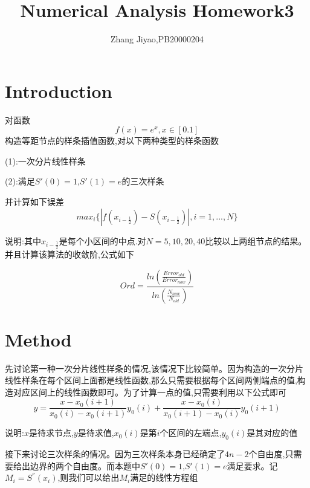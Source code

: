 \documentclass{article}
\title{Numerical Analysis Homework3}
\author{Zhang Jiyao,PB20000204}
\begin{document}
	\maketitle
	
	\section{Introduction}
	
	对函数
	$$ f(x)=e^x,x\in [0.1]$$
	构造等距节点的样条插值函数,对以下两种类型的样条函数
	
	(1):一次分片线性样条
	
	(2):满足$S'(0)=1$,$S'(1)=e$的三次样条
	
	并计算如下误差
	$$max_i\{\left|f(x_{i-\frac{1}{2}})-S(x_{i-\frac{1}{2}})\right|, i=1,...,N \}$$
	
	说明:其中$x_{i-\frac{1}{2}}$是每个小区间的中点.对$N=5,10,20,40$比较以上两组节点的结果。并且计算该算法的收敛阶,公式如下
	
	$$Ord=\frac{ln(\frac{Error_{old}}{Error_{now}})}{ln(\frac{N_{now}}{N_{old}})}$$
	
	
	
	\section{Method}
	
	先讨论第一种一次分片线性样条的情况,该情况下比较简单。因为构造的一次分片线性样条在每个区间上面都是线性函数,那么只需要根据每个区间两侧端点的值,构造对应区间上的线性函数即可。为了计算一点的值,只需要利用以下公式即可
	$$y=\frac{x-x_0(i+1)}{x_0(i)-x_0(i+1)}y_0(i)+\frac{x-x_0(i)}{x_0(i+1)-x_0(i)}y_0(i+1)$$
	
	说明:$x$是待求节点,$y$是待求值,$x_0(i)$是第$i$个区间的左端点,$y_0(i)$是其对应的值
	
	接下来讨论三次样条的情况。因为三次样条本身已经确定了$4n-2$个自由度,只需要给出边界的两个自由度。而本题中$S'(0)=1$,$S'(1)=e$满足要求。记$M_i=S^{''}(x_i)$,则我们可以给出$M_i$满足的线性方程组
	
\end{document}
